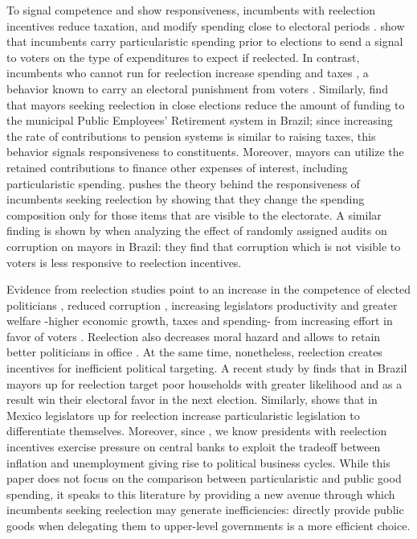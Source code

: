\documentclass[12pt]{amsart}
\numberwithin{equation}{section}
\theoremstyle{definition}
\theoremstyle{definition}
\theoremstyle{definition}
\begin{document}
To signal competence and show responsiveness, incumbents with reelection incentives reduce taxation, and modify spending close to electoral periods \citep{Rogoff_1988, Rogoff_1990, klein_sakurai_2015}. \citet{Drazen_eslava_2005} show that incumbents carry particularistic spending prior to elections to send a signal to voters on the type of expenditures to expect if reelected. In contrast, incumbents who cannot run for reelection increase spending and taxes \citep{Besley_case_1995}, a behavior known to carry an electoral punishment from voters \citep{peltzman_1992}. Similarly, \citet{Schettini_2020} find that mayors seeking reelection in close elections reduce the amount of funding to the municipal Public Employees’ Retirement system in Brazil; since increasing the rate of contributions to pension systems is similar to raising taxes, this behavior signals responsiveness to constituents. Moreover, mayors can utilize the retained contributions to finance other expenses of interest, including particularistic spending. \citet{akhmedov_2004} pushes the theory behind the responsiveness of incumbents seeking reelection by showing that they change the spending composition only for those items that are visible to the electorate. A similar finding is shown by \citet{ferraz_finan_2011} when analyzing the effect of randomly assigned audits on corruption on mayors in Brazil: they find that corruption which is not visible to voters is less responsive to reelection incentives.

Evidence from reelection studies point to an increase in the competence of elected politicians \citep{dalbo_etal_2017}, reduced corruption \citep{ferraz_finan_2011}, increasing legislators productivity \citep{hall_etal_2018} and greater welfare -higher economic growth, taxes and spending- from increasing effort in favor of voters \citep{alt_etal_2011}. Reelection also decreases moral hazard and allows to retain better politicians in office \citep{smart_sturm_2013}. At the same time, nonetheless, reelection creates incentives for inefficient political targeting. A recent study by \citet{frey_2021} finds that in Brazil mayors up for reelection target poor households with greater likelihood and as a result win their electoral favor in the next election. Similarly, \citet{motolinia_2020} shows that in Mexico legislators up for reelection increase particularistic legislation to differentiate themselves. Moreover, since \citet{Nordhaus_1975}, we know presidents with reelection incentives exercise pressure on central banks to exploit the tradeoff between inflation and unemployment giving rise to political business cycles. While this paper does not focus on the comparison between particularistic and public good spending, it speaks to this literature by providing a new avenue through which incumbents seeking reelection may generate inefficiencies: directly provide public goods when delegating them to upper-level governments is a more efficient choice. 
  
\end{document}
